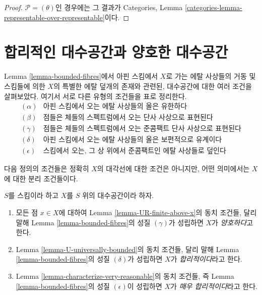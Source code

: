 \begin{proof}
\medskip\noindent
$\mathcal{P} = (\theta)$인 경우에는 그 결과가 Categories, Lemma
\ref{categories-lemma-representable-over-representable}이다.
\end{proof}

\section{합리적인 대수공간과 양호한 대수공간}
\label{section-reasonable-decent}

\noindent
Lemma \ref{lemma-bounded-fibres}에서 아핀 스킴에서 $X$로 가는 에탈
사상들의 거동 및 스킴들에 의한 $X$의 특별한 에탈 덮개의 존재와 관련된,
대수공간에 대한 여러 조건을 살펴보았다. 여기서 서로 다른 유형의 조건들을
표로 정리한다.
$$
\boxed{
\begin{matrix}
(\alpha) & \text{아핀 스킴에서 오는 에탈 사상들의 올은 유한하다} \\
(\beta) & \text{점들은 체들의 스펙트럼에서 오는 단사 사상으로 표현된다} \\
(\gamma) & \text{점들은 체들의 스펙트럼에서 오는 준콤팩트 단사 사상으로
표현된다} \\
(\delta) & \text{아핀 스킴에서 오는 에탈 사상들의 올은 보편적으로
유계이다} \\
(\epsilon) & \text{스킴에서 오는, 그 상 위에서 준콤팩트인 에탈
사상들로 덮인다}
\end{matrix}
}
$$

\medskip\noindent
다음 정의의 조건들은 정확히 $X$의 대각선에 대한 조건은 아니지만,
어떤 의미에서는 $X$에 대한 분리 조건들이다.

\begin{definition}
\label{definition-very-reasonable}
$S$를 스킴이라 하고 $X$를 $S$ 위의 대수공간이라 하자.
\begin{enumerate}
\item 모든 점 $x \in X$에 대하여 Lemma
\ref{lemma-UR-finite-above-x}의 동치 조건들, 달리 말해 Lemma
\ref{lemma-bounded-fibres}의 성질 $(\gamma)$가 성립하면
$X$가 {\it 양호하다}고 한다.
\item Lemma \ref{lemma-U-universally-bounded}의 동치 조건들,
달리 말해 Lemma \ref{lemma-bounded-fibres}의 성질 $(\delta)$가
성립하면 $X$가 {\it 합리적이다}라고 한다.
\item Lemma \ref{lemma-characterize-very-reasonable}의 동치 조건들,
즉 Lemma \ref{lemma-bounded-fibres}의 성질 $(\epsilon)$이 성립하면
$X$가 {\it 매우 합리적이다}라고 한다.
\end{enumerate}
\end{definition}

